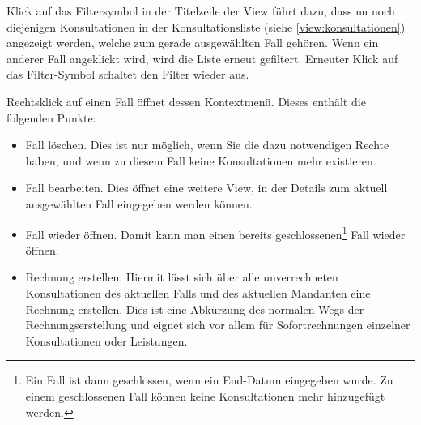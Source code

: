 \medskip

\label{filter:fall}
Klick auf das Filtersymbol in der Titelzeile der View führt dazu, dass nu noch diejenigen Konsultationen in der Konsultationsliste (siehe \ref{view:konsultationen}) angezeigt werden, welche zum gerade ausgewählten Fall gehören. Wenn ein anderer Fall angeklickt wird, wird die Liste erneut gefiltert. Erneuter Klick auf das Filter-Symbol schaltet den Filter wieder aus.

Rechtsklick auf einen Fall öffnet dessen Kontextmenü. Dieses enthält die
folgenden Punkte:
\begin{itemize}
  \item {Fall löschen}. Dies ist nur möglich, wenn Sie die dazu notwendigen Rechte
  haben, und wenn zu diesem Fall keine Konsultationen mehr existieren.
  \item {Fall bearbeiten}. Dies öffnet eine weitere View, in der Details zum
  aktuell ausgewählten Fall eingegeben werden können.
  \item {Fall wieder öffnen}. Damit kann man einen bereits
  geschlossenen\footnote{Ein Fall ist dann geschlossen, wenn ein End-Datum
  eingegeben wurde. Zu einem geschlossenen Fall können keine Konsultationen mehr
  hinzugefügt werden.} Fall wieder öffnen.
  \item {Rechnung erstellen}. Hiermit lässt sich über alle unverrechneten
  Konsultationen des aktuellen Falls und des aktuellen Mandanten eine Rechnung
  erstellen. Dies ist eine \glqq Abkürzung\grqq{} des normalen Wegs der
  Rechnungserstellung und eignet sich vor allem für Sofortrechnungen einzelner
  Konsultationen oder Leistungen.
\end{itemize}


